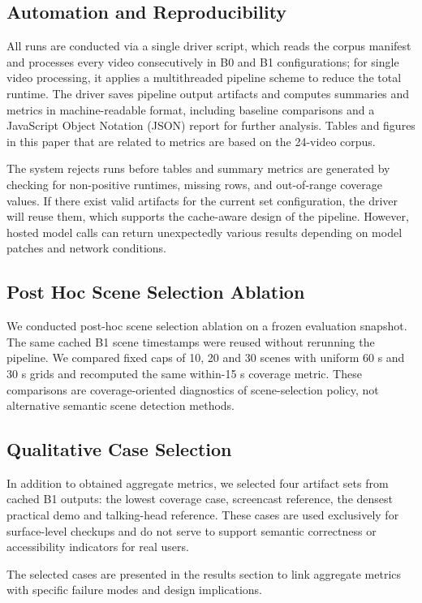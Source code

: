 ﻿\documentclass[conference]{IEEEtran}
\begin{document}
\subsection{Automation and Reproducibility}
All runs are conducted via a single driver script, which reads the corpus manifest and processes every video consecutively in B0 and B1 configurations; for single video processing, it applies a multithreaded pipeline scheme to reduce the total runtime. The driver saves pipeline output artifacts and computes summaries and metrics in machine-readable format, including baseline comparisons and a JavaScript Object Notation (JSON) report for further analysis. Tables and figures in this paper that are related to metrics are based on the 24-video corpus.

The system rejects runs before tables and summary metrics are generated by checking for non-positive runtimes, missing rows, and out-of-range coverage values. If there exist valid artifacts for the current set configuration, the driver will reuse them, which supports the cache-aware design of the pipeline. However, hosted model calls can return unexpectedly various results depending on model patches and network conditions.

\subsection{Post Hoc Scene Selection Ablation}
We conducted post-hoc scene selection ablation on a frozen evaluation snapshot. The same cached B1 scene timestamps were reused without rerunning the pipeline. We compared fixed caps of 10, 20 and 30 scenes with uniform 60 s and 30 s grids and recomputed the same within-15 s coverage metric. These comparisons are coverage-oriented diagnostics of scene-selection policy, not alternative semantic scene detection methods.

\subsection{Qualitative Case Selection}
In addition to obtained aggregate metrics, we selected four artifact sets from cached B1 outputs: the lowest coverage case, screencast reference, the densest practical demo and talking-head reference. These cases are used exclusively for surface-level checkups and do not serve to support semantic correctness or accessibility indicators for real users.

The selected cases are presented in the results section to link aggregate metrics with specific failure modes and design implications.
\end{document}
